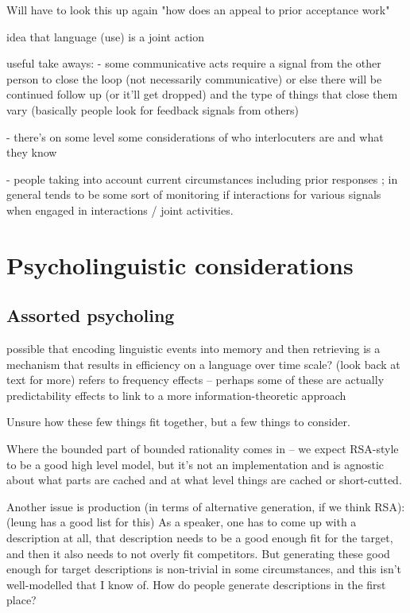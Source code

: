 \documentclass[]{article}
\begin{document}
\cite{clark1986} Will have to look this up again "how does an appeal to prior acceptance work"



\cite{clark1996} idea that language (use) is a joint action

\cite{clark1996} useful take aways: - some communicative acts require a signal from the other person to close the loop (not necessarily communicative) or else there will be continued follow up (or it’ll get dropped) and the type of things that close them vary (basically people look for feedback signals from others)

- there’s on some level some considerations of who interlocuters are and what they know

- people taking into account current circumstances including prior responses ; in general tends to be some sort of monitoring if interactions for various signals when engaged in interactions / joint activities.






\section{Psycholinguistic considerations}

\subsection{Assorted psycholing}
\cite{bybee2006} possible that encoding linguistic events into memory and then retrieving is a mechanism that results in efficiency on a language over time scale? (look back at text for more) 
refers to frequency effects -- perhaps some of these are actually predictability effects to link to a more information-theoretic approach 

Unsure how these few things fit together, but a few things to consider.

Where the bounded part of bounded rationality comes in -- we expect RSA-style to be a good high level model, but it's not an implementation and is agnostic about what parts are cached and at what level things are cached or short-cutted. 

Another issue is production (in terms of alternative generation, if we think RSA): (leung has a good list for this) As a speaker, one has to come up with a description at all, that description needs to be a good enough fit for the target, and then it also needs to not overly fit competitors. But generating these good enough for target descriptions is non-trivial in some circumstances, and this isn't well-modelled that I know of. How do people generate descriptions in the first place? 
\end{document}
